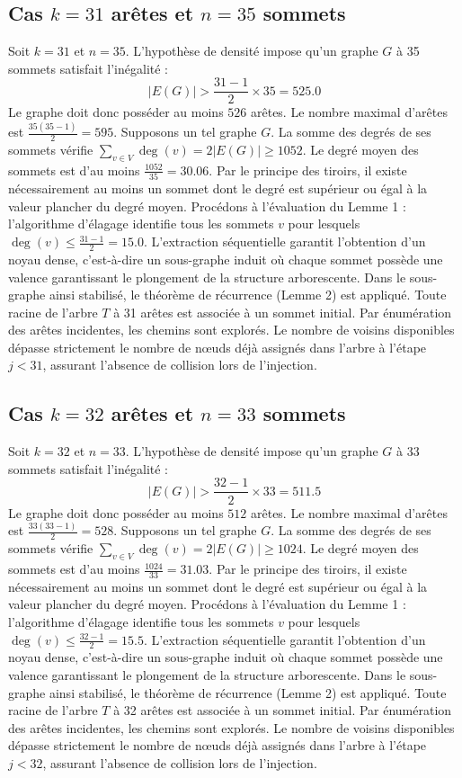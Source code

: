 \documentclass[12pt,a4paper]{article}
\begin{document}
\subsection{Cas $k = 31$ arêtes et $n = 35$ sommets}
Soit $k = 31$ et $n = 35$. L'hypothèse de densité impose qu'un graphe $G$ à 35 sommets satisfait l'inégalité :
$$ |E(G)| > \frac{31-1}{2} \times 35 = 525.0 $$
Le graphe doit donc posséder au moins $526$ arêtes. Le nombre maximal d'arêtes est $\frac{35(35-1)}{2} = 595$.
Supposons un tel graphe $G$. La somme des degrés de ses sommets vérifie $\sum_{v \in V} \deg(v) = 2|E(G)| \geq 1052$.
Le degré moyen des sommets est d'au moins $\frac{1052}{35} = 30.06$.
Par le principe des tiroirs, il existe nécessairement au moins un sommet dont le degré est supérieur ou égal à la valeur plancher du degré moyen.
Procédons à l'évaluation du Lemme 1 : l'algorithme d'élagage identifie tous les sommets $v$ pour lesquels $\deg(v) \leq \frac{31-1}{2} = 15.0$.
L'extraction séquentielle garantit l'obtention d'un noyau dense, c'est-à-dire un sous-graphe induit où chaque sommet possède une valence garantissant le plongement de la structure arborescente.
Dans le sous-graphe ainsi stabilisé, le théorème de récurrence (Lemme 2) est appliqué. Toute racine de l'arbre $T$ à 31 arêtes est associée à un sommet initial. Par énumération des arêtes incidentes, les chemins sont explorés. Le nombre de voisins disponibles dépasse strictement le nombre de nœuds déjà assignés dans l'arbre à l'étape $j < 31$, assurant l'absence de collision lors de l'injection.

\subsection{Cas $k = 32$ arêtes et $n = 33$ sommets}
Soit $k = 32$ et $n = 33$. L'hypothèse de densité impose qu'un graphe $G$ à 33 sommets satisfait l'inégalité :
$$ |E(G)| > \frac{32-1}{2} \times 33 = 511.5 $$
Le graphe doit donc posséder au moins $512$ arêtes. Le nombre maximal d'arêtes est $\frac{33(33-1)}{2} = 528$.
Supposons un tel graphe $G$. La somme des degrés de ses sommets vérifie $\sum_{v \in V} \deg(v) = 2|E(G)| \geq 1024$.
Le degré moyen des sommets est d'au moins $\frac{1024}{33} = 31.03$.
Par le principe des tiroirs, il existe nécessairement au moins un sommet dont le degré est supérieur ou égal à la valeur plancher du degré moyen.
Procédons à l'évaluation du Lemme 1 : l'algorithme d'élagage identifie tous les sommets $v$ pour lesquels $\deg(v) \leq \frac{32-1}{2} = 15.5$.
L'extraction séquentielle garantit l'obtention d'un noyau dense, c'est-à-dire un sous-graphe induit où chaque sommet possède une valence garantissant le plongement de la structure arborescente.
Dans le sous-graphe ainsi stabilisé, le théorème de récurrence (Lemme 2) est appliqué. Toute racine de l'arbre $T$ à 32 arêtes est associée à un sommet initial. Par énumération des arêtes incidentes, les chemins sont explorés. Le nombre de voisins disponibles dépasse strictement le nombre de nœuds déjà assignés dans l'arbre à l'étape $j < 32$, assurant l'absence de collision lors de l'injection.
\end{document}
